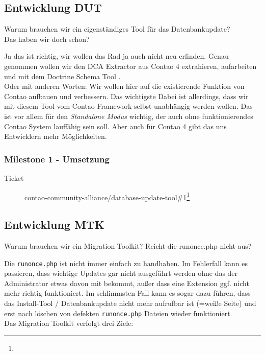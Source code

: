 \documentclass[
paper=a4,
draft=false,%
fontsize=10pt%
]{scrartcl}
\begin{document}
\subsection{Entwicklung DUT}
\label{subsec:dut}

\begin{emquotation}
Warum brauchen wir ein eigenständiges Tool für das Datenbankupdate? \\
\hspace*{\fill}Das haben wir doch schon?
\end{emquotation}

Ja das ist richtig, wir wollen das Rad ja auch nicht neu erfinden. Genau genommen wollen wir den DCA Extractor aus Contao 4 extrahieren, aufarbeiten und mit dem Doctrine Schema Tool .\\
Oder mit anderen Worten: Wir wollen hier auf die existierende Funktion von Contao aufbauen und verbessern. Das wichtigste Dabei ist allerdings, dass wir mit diesem Tool vom Contao Framework selbst unabhängig werden wollen. Das ist vor allem für den \textit{Standalone Modus} wichtig, der auch ohne funktionierendes Contao System lauffähig sein soll. Aber auch für Contao 4 gibt das uns Entwicklern mehr Möglichkeiten.

\subsubsection{Milestone 1 - Umsetzung}
\label{subsec:dut-milestone-1}

\begin{description}
\item[Ticket] contao-community-alliance/database-update-tool\#1\footnote{}
\end{description}

\pagebreak

\subsection{Entwicklung MTK}
\label{subsec:mtk}

\begin{emquotation}
Warum brauchen wir ein Migration Toolkit? Reicht die runonce.php nicht aus?
\end{emquotation}

Die \texttt{runonce.php} ist nicht immer einfach zu handhaben. Im Fehlerfall kann es passieren, dass wichtige Updates gar nicht ausgeführt werden ohne das der Administrator etwas davon mit bekommt, außer dass eine Extension ggf. nicht mehr richtig funktioniert. Im schlimmsten Fall kann es sogar dazu führen, dass das Install-Tool / Datenbankupdate nicht mehr aufrufbar ist (=weiße Seite) und erst nach löschen von defekten \texttt{runonce.php} Dateien wieder funktioniert.\\
Das Migration Toolkit verfolgt drei Ziele:
\end{document}
